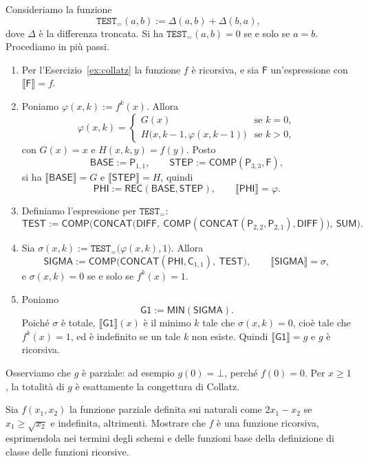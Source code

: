 \begin{sol}
Consideriamo la funzione
\[
\texttt{TEST}_{=}(a,b):=\Delta(a,b)+\Delta(b,a),
\]
dove $\Delta$ è la differenza troncata. Si ha $\texttt{TEST}_{=}(a,b)=0$ se e solo se $a=b$. Procediamo in più passi.
\begin{enumerate}
\item Per l'Esercizio~\ref{ex:collatz} la funzione $f$ è ricorsiva, e sia $\mathsf F$ un'espressione con $\llbracket\mathsf F\rrbracket=f$.
\item Poniamo $\varphi(x,k):=f^k(x)$. Allora
\[
\varphi(x,k)=
\begin{cases}
G(x) & \text{se } k=0,\\
H\big(x,k-1,\varphi(x,k-1)\big) & \text{se } k>0,
\end{cases}
\]
con $G(x)=x$ e $H(x,k,y)=f(y)$. Posto
\[
\mathsf{BASE}:=\mathsf P_{1,1},\qquad \mathsf{STEP}:=\mathsf{COMP}(\mathsf P_{3,3},\mathsf F),
\]
si ha $\llbracket\mathsf{BASE}\rrbracket=G$ e $\llbracket\mathsf{STEP}\rrbracket=H$, quindi
\[
\mathsf{PHI}:=\mathsf{REC}(\mathsf{BASE},\mathsf{STEP}),\qquad \llbracket\mathsf{PHI}\rrbracket=\varphi.
\]
\item Definiamo l'espressione per $\texttt{TEST}_{=}$:
\[
\mathsf{TEST}:=\mathsf{COMP}\big(\mathsf{CONCAT}\big(\mathsf{DIFF},\ \mathsf{COMP}(\mathsf{CONCAT}(\mathsf P_{2,2},\mathsf P_{2,1}),\mathsf{DIFF})\big),\ \mathsf{SUM}\big).
\]
\item Sia $\sigma(x,k):=\texttt{TEST}_{=}\big(\varphi(x,k),1\big)$. Allora
\[
\mathsf{SIGMA}:=\mathsf{COMP}\big(\mathsf{CONCAT}(\mathsf{PHI},\mathsf C_{1,1}),\ \mathsf{TEST}\big),\qquad \llbracket\mathsf{SIGMA}\rrbracket=\sigma,
\]
e $\sigma(x,k)=0$ se e solo se $f^k(x)=1$.
\item Poniamo
\[
\mathsf{G1}:=\mathsf{MIN}(\mathsf{SIGMA}).
\]
Poiché $\sigma$ è totale, $\llbracket\mathsf{G1}\rrbracket(x)$ è il minimo $k$ tale che $\sigma(x,k)=0$, cioè tale che $f^k(x)=1$, ed è indefinito se un tale $k$ non esiste. Quindi $\llbracket\mathsf{G1}\rrbracket=g$ e $g$ è ricorsiva.
\end{enumerate}
Osserviamo che $g$ è parziale: ad esempio $g(0)=\bot$, perché $f(0)=0$. Per $x\ge1$, la totalità di $g$ è esattamente la congettura di Collatz.
\end{sol}



\newpage 



\begin{ex}
Sia $f(x_1,x_2)$ la funzione parziale definita sui naturali come $2x_1-x_2$ se $x_1\geq\sqrt{x_2}$ e indefinita, altrimenti. Mostrare che $f$ è una funzione ricorsiva, esprimendola nei termini degli schemi e delle funzioni base della definizione di classe delle funzioni ricorsive.
\end{ex}

